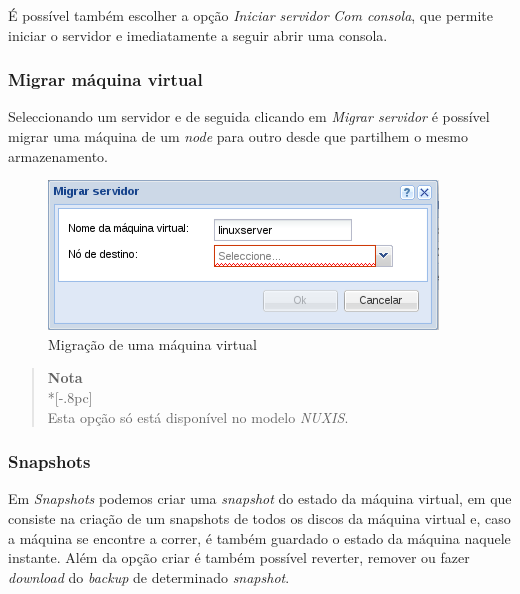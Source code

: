 É possível também escolher a opção \emph{Iniciar servidor} \emph{Com consola}, que permite iniciar o servidor e imediatamente a seguir abrir uma consola.

\subsubsection{Migrar máquina virtual}
\label{sec:migrate_server}

Seleccionando um servidor e de seguida clicando em \emph{Migrar servidor} é possível migrar uma máquina de um \emph{node} para outro desde que partilhem o mesmo armazenamento.

\begin{figure}[H]
	\begin{center}
	\includegraphics[scale=0.5]{screenshots/server_migrate.png}
	\caption{Migração de uma máquina virtual}
	\label{fig:server_migrate}
	\end{center}
\end{figure}

\begin{quote}
	{\large \bf Nota} \\*[-.8pc]
	\underline{\hspace{6in}} \\
	Esta opção só está disponível no modelo \emph{NUXIS}.
\end{quote}

\subsubsection{Snapshots}
\label{sec:server_snapshots}

Em \emph{Snapshots} podemos criar uma \emph{snapshot} do estado da máquina virtual, em que consiste na criação de um snapshots de todos os discos da máquina virtual e, caso a máquina se encontre a correr, é também guardado o estado da máquina naquele instante.
Além da opção criar é também possível reverter, remover ou fazer \emph{download} do \emph{backup} de determinado \emph{snapshot}.

